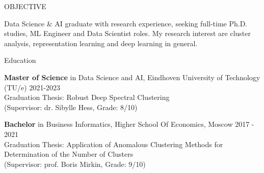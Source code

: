 \documentclass{resume} %
\begin{document}

\begin{rSection}{OBJECTIVE}

{Data Science \& AI graduate with research experience, seeking full-time Ph.D. studies, ML Engineer and Data Scientist roles. My research interest are cluster analysis, representation learning and deep learning in general.}


\end{rSection}

\begin{rSection}{Education}

{\bf Master of Science} in Data Science and AI, Eindhoven University of Technology (TU/e) \hfill {2021-2023}\\
Graduation Thesis: Robust Deep Spectral Clustering \\
(Supervisor: dr. Sibylle Hess, Grade: 8/10)

{\bf Bachelor} in Business Informatics, Higher School Of Economics, Moscow \hfill {2017 - 2021}\\
Graduation Thesis: Application of Anomalous Clustering Methods for Determination of the Number of Clusters\\
(Supervisor: prof. Boris Mirkin, Grade: 9/10)


\end{rSection}
\end{document}
